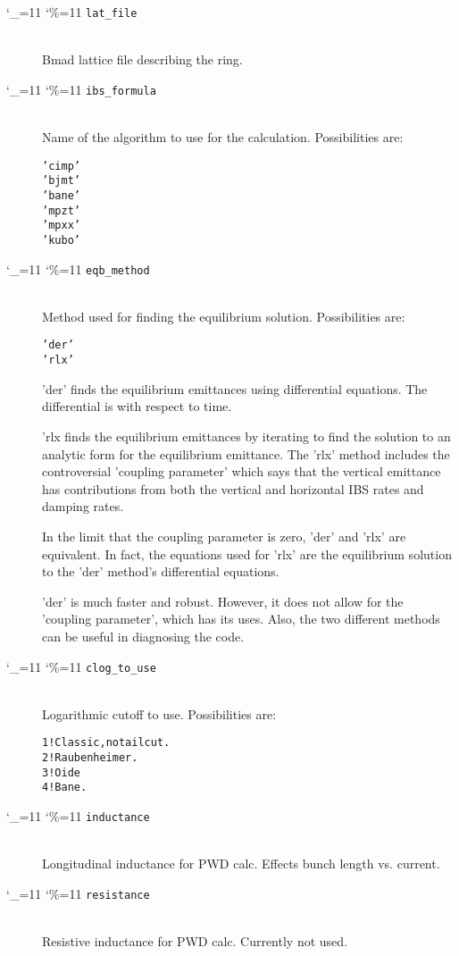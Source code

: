 \documentclass[11pt]{article}
\newcommand\ttcmd{\begingroup\catcode`\_=11 \catcode`\%=11 \dottcmd}
\newcommand\dottcmd[1]{\texttt{#1}\endgroup}
\newcommand{\vn}{\ttcmd}
\newcommand{\Newline}{\hfil \\}
\newlength{\ExBeg}
\newlength{\ExEnd}
\newenvironment{example}
  {\vspace{\ExBeg} \begin{alltt}}
  {\end{alltt} \vspace{\ExEnd}}
\begin{document}
  \begin{description}
  \item[\vn{lat_file}] \Newline
Bmad lattice file describing the ring.

  \item[\vn{ibs_formula}] \Newline
Name of the algorithm to use for the calculation. Possibilities are:
\begin{example}
  'cimp'
  'bjmt'
  'bane'
  'mpzt'
  'mpxx'
  'kubo'
\end{example}

  \item[\vn{eqb_method}] \Newline
Method used for finding the equilibrium solution. Possibilities are:
\begin{example}
  'der'
  'rlx'
\end{example}
'der' finds the equilibrium emittances using differential equations.
The differential is with respect to time.

'rlx finds the equilibrium emittances by iterating to find the
solution to an analytic form for the equilibrium emittance.  The 'rlx'
method includes the controversial 'coupling parameter' which says that
the vertical emittance has contributions from both the vertical and
horizontal IBS rates and damping rates.

In the limit that the coupling parameter is zero, 'der' and 'rlx' are
equivalent.  In fact, the equations used for 'rlx' are the equilibrium
solution to the 'der' method's differential equations.

'der' is much faster and robust.  However, it does not allow for the
'coupling parameter', which has its uses.  Also, the two different
methods can be useful in diagnosing the code.

  \item[\vn{clog_to_use}] \Newline
Logarithmic cutoff to use. Possibilities are:
\begin{example}
  1  ! Classic, no tail cut.  
  2  ! Raubenheimer.  
  3  ! Oide
  4  ! Bane.  
\end{example} 

  \item[\vn{inductance}] \Newline
Longitudinal inductance for PWD calc.
Effects bunch length vs. current.

  \item[\vn{resistance}] \Newline
Resistive inductance for PWD calc.
Currently not used. 


\end{description}
\end{document}
